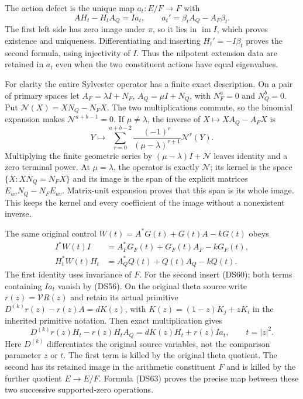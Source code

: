 The action defect is the unique map $a_t:E/F\to F$ with
\[
 AH_t-H_tA_Q=Ia_t,\qquad
 a_t'=\beta_tA_Q-A_F\beta_t.
 \tag{DS60}
\]
The first left side has zero image under $\pi$, so it lies in
$\operatorname{im}I$, which proves existence and uniqueness.
Differentiating and inserting $H_t'=-I\beta_t$ proves the second
formula, using injectivity of $I$.  Thus the nilpotent extension
data are retained in $a_t$ even when the two constituent actions
have equal eigenvalues.

For clarity the entire Sylvester operator has a finite exact
description.  On a pair of primary spaces let
$A_F=\lambda I+N_F$, $A_Q=\mu I+N_Q$, with
$N_F^a=0$ and $N_Q^b=0$.  Put
$\mathcal N(X)=XN_Q-N_FX$.  The two multiplications commute, so
the binomial expansion makes $\mathcal N^{a+b-1}=0$.  If
$\mu\ne\lambda$, the inverse of
$X\mapsto XA_Q-A_FX$ is
\[
 Y\longmapsto
 \sum_{r=0}^{a+b-2}
 \frac{(-1)^r}{(\mu-\lambda)^{r+1}}\mathcal N^r(Y).
 \tag{DS61}
\]
Multiplying the finite geometric series by
$(\mu-\lambda)I+\mathcal N$ leaves identity and a zero terminal
power.  At $\mu=\lambda$, the operator is exactly $\mathcal N$;
its kernel is the space $\{X:XN_Q=N_FX\}$ and its image is the
span of the explicit matrices
$E_{uv}N_Q-N_FE_{uv}$.  Matrix-unit expansion proves that this
span is its whole image.  This keeps the kernel and every
coefficient of the image without a nonexistent inverse.

The same original control $W(t)=A^*G(t)+G(t)A-kG(t)$ obeys
\[
\begin{split}
 I^*W(t)I&=A_F^*G_F(t)+G_F(t)A_F-kG_F(t),\\
 H_t^*W(t)H_t&=A_Q^*Q(t)+Q(t)A_Q-kQ(t).
\end{split}\tag{DS62}
\]
The first identity uses invariance of $F$.  For the second insert
(DS60); both terms containing $Ia_t$ vanish by (DS56).
On the original theta source write $r(z)=\mathcal VR(z)$ and
retain its actual primitive
$D^{(k)}r(z)-r(z)A=dK(z)$, with
$K(z)=(1-z)K_j+zK_i$ in the inherited primitive notation.
Then exact multiplication gives
\[
 D^{(k)}r(z)H_t-r(z)H_tA_Q
 =dK(z)H_t+r(z)Ia_t,\qquad t=|z|^2.
 \tag{DS63}
\]
Here $D^{(k)}$ differentiates the original source variables, not the
comparison parameter $z$ or $t$.  The first term is killed by the
original theta quotient.  The second has its retained image in the
arithmetic constituent $F$ and is killed by the further quotient
$E\to E/F$.  Formula (DS63) proves the precise map between these
two successive supported-zero operations.

